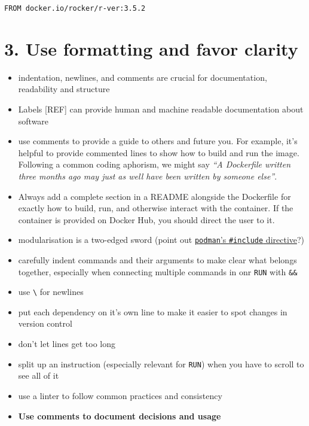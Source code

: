 \documentclass[10pt,letterpaper]{article}
\providecommand{\tightlist}{%
  \setlength{\itemsep}{0pt}\setlength{\parskip}{0pt}}
\begin{document}
\begin{verbatim}
FROM docker.io/rocker/r-ver:3.5.2
\end{verbatim}

\hypertarget{use-formatting-and-favor-clarity}{%
\section{3. Use formatting and favor
clarity}\label{use-formatting-and-favor-clarity}}

\begin{itemize}
\tightlist
\item
  indentation, newlines, and comments are crucial for documentation,
  readability and structure
\item
  Labels {[}REF{]} can provide human and machine readable documentation
  about software
\item
  use comments to provide a guide to others and future you. For example,
  it's helpful to provide commented lines to show how to build and run
  the image. Following a common coding aphorism, we might say \emph{``A
  Dockerfile written three months ago may just as well have been written
  by someone else''}.
\item
  Always add a complete section in a README alongside the Dockerfile for
  exactly how to build, run, and otherwise interact with the container.
  If the container is provided on Docker Hub, you should direct the user
  to it.
\item
  modularisation is a two-edged sword (point out
  \href{https://www.mankier.com/1/podman-build}{\texttt{podman}'s
  \texttt{\#include} directive}?) 
\item
  carefully indent commands and their arguments to make clear what
  belongs together, especially when connecting multiple commands in onr
  \texttt{RUN} with \texttt{\&\&}
\item
  use \texttt{\textbackslash{}} for newlines
\item
  put each dependency on it's own line to make it easier to spot changes
  in version control
\item
  don't let lines get too long
\item
  split up an instruction (especially relevant for \texttt{RUN}) when
  you have to scroll to see all of it
\item
  use a linter to follow common practices and consistency 
\item
  \textbf{Use comments to document decisions and usage}


\end{itemize}
\end{document}
